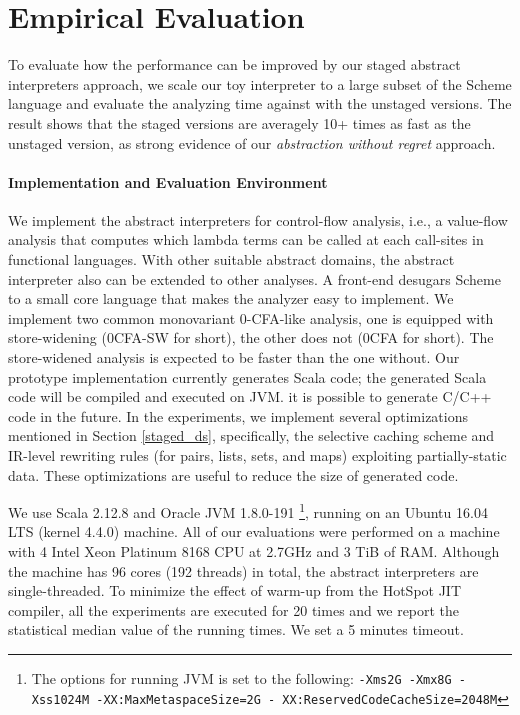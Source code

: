 \section{Empirical Evaluation} \label{evaluation}

To evaluate how the performance can be improved by our staged abstract interpreters
approach, we scale our toy interpreter to a large subset of the Scheme language
and evaluate the analyzing time against with the unstaged versions. The result
shows that the staged versions are averagely 10+ times as fast as the unstaged
version, as strong evidence of our \textit{abstraction without regret}
approach.

\paragraph{Implementation and Evaluation Environment}
We implement the abstract interpreters for control-flow analysis, i.e., a
value-flow analysis that computes which lambda terms can be called at each
call-sites in functional languages. With other suitable abstract domains, the
abstract interpreter also can be extended to other analyses. A front-end
desugars Scheme to a small core language that makes the analyzer easy to
implement. We implement two common monovariant 0-CFA-like analysis, one is
equipped with store-widening (0CFA-SW for short), the other does not (0CFA for
short). The store-widened analysis is expected to be faster than the one
without.  Our prototype implementation currently generates Scala code; the
generated Scala code will be compiled and executed on JVM. it is possible to
generate C/C++ code in the future. In the experiments, we implement several
optimizations mentioned in Section \ref{staged_ds}, specifically, the selective
caching scheme and IR-level rewriting rules (for pairs, lists, sets, and maps) exploiting
partially-static data. These optimizations are useful to reduce the size of
generated code.

We use Scala 2.12.8 and Oracle JVM 1.8.0-191 \footnote{The options for
running JVM is set to the following: \texttt{-Xms2G -Xmx8G -Xss1024M
-XX:MaxMetaspaceSize=2G - XX:ReservedCodeCacheSize=2048M}},
running on an Ubuntu 16.04 LTS (kernel 4.4.0) machine. All of our
evaluations were performed on a machine with 4 Intel Xeon Platinum
8168 CPU at 2.7GHz and 3 TiB of RAM. Although the machine has 96 cores
(192 threads) in total, the abstract interpreters are single-threaded.
To minimize the effect of warm-up from the HotSpot JIT compiler,
all the experiments are executed for 20 times and we report the
statistical median value of the running times. We set a 5 minutes
timeout.

